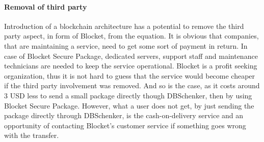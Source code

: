 \paragraph{Removal of third party}
Introduction of a blockchain architecture has a potential to remove the third party aspect, in form of Blocket, from the equation. It is obvious that companies, that are maintaining a service, need to get some sort of payment in return. In case of Blocket Secure Package, dedicated servers, support staff and maintenance technicians are needed to keep the service operational. Blocket is a profit seeking organization, thus it is not hard to guess that the service would become cheaper if the third party involvement was removed. And so is the case, as it costs around 3 USD less to send a small package directly though DBSchenker, then by using Blocket Secure Package. However, what a user does not get, by just sending the package directly through DBSchenker, is the cash-on-delivery service and an opportunity of contacting Blocket's customer service if something goes wrong with the transfer.
  




